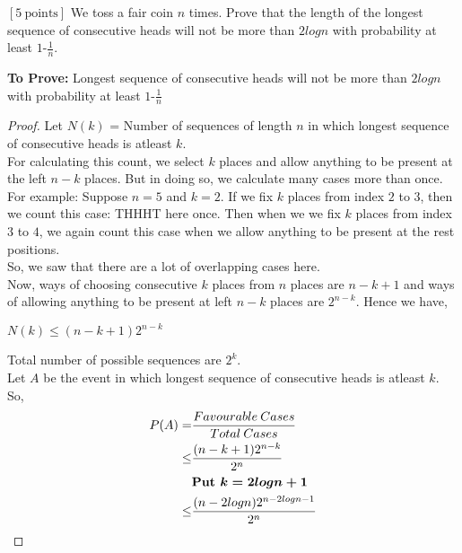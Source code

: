\documentclass[12pt]{article}
\begin{document}
    \noindent
    
    \onehalfspace

    \begin{question}
        $[5 \:\text{points}]$ We toss a fair coin $n$ times. Prove that the length of the longest sequence of consecutive heads will not be more than $2 log n$ with probability at least $1$-$\frac{1}{n}$.
   
    \end{question}

    \begin{solution}
        \textbf{To Prove:} Longest sequence of consecutive heads will not be more than $2 log n$ with probability at least $1$-$\frac{1}{n}$
        \begin{proof}
            Let $N(k)$ = Number of sequences of length $n$ in which longest sequence of consecutive heads is atleast $k$.\\
            For calculating this count, we select $k$ places and allow anything to be present at the left $n-k$ places. But in doing so, we calculate many cases more than once. \\
            For example: Suppose $n=5$ and $k=2$. If we fix $k$ places from index $2$ to $3$, then we count this case: THHHT here once.
            Then when we we fix $k$ places from index $3$ to $4$, we again count this case when we allow anything to be present at the rest positions.\\
            So, we saw that there are a lot of overlapping cases here.\\
            Now, ways of choosing consecutive $k$ places from $n$ places are $n-k+1$ and ways of allowing anything to be present at left $n-k$ places are $2^{n-k}$.
            Hence we have,
            \begin{center}
            $N(k)\leq(n-k+1)2^{n-k}$
            \end{center}
            Total number of possible sequences are $2^k$.\\
            Let $A$ be the event in which longest sequence of consecutive heads is atleast $k$. So,\\
            \begin{align*}
                P(A) = & \frac{Favourable\: Cases}{Total\: Cases}\\
                \leq & \frac{(n-k+1)2^{n-k}}{2^n}\\
                \quad\quad&\textbf{Put \boldmath{$k=2logn + 1$}}\\
                \leq & \frac{(n-2logn)2^{n-2logn-1}}{2^n}\\

\end{align*}
\end{proof}
\end{solution}
\end{document}
